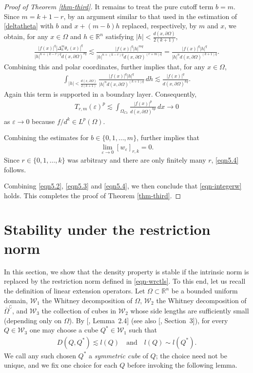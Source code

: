 \documentclass[11pt,twoside]{article}
\def\rn{{\mathbb{R}^n}}
\def\boz{{\Omega}}
\def\vez{\varepsilon}
\def\pa{\partial}                %
\theoremstyle{mylem}
\theoremstyle{definition}
\numberwithin{equation}{section}
\begin{document}
\begin{proof}[Proof of Theorem \ref{thm-third}]
It remains to treat the pure cutoff term $b=m$.  Since $m=k+1-r$, by an argument similar to that used in the estimation of \eqref{deltatheta}
with $b$ and $x+(m-b)h$ replaced, respectively, by $m$ and $x$, we obtain, for any $x\in\boz$ and $h\in\rn$ satisfying $|h|<\frac{d(x,\pa\boz)}{2(k+1)}$,
\begin{align*}
\frac{|f(x)|^q|\Delta_h^m\theta_\vez(x)|^q}
{|h|^{n+(k-r)q}d(x,\pa\boz)^{rq}}
\lesssim
\frac{|f(x)|^q |h|^{mq}}
{|h|^{n+(k-r)q}d(x,\pa\boz)^{(r+m)q}}
=\frac{|f(x)|^q |h|^q}{|h|^n d(x,\pa\boz)^{(k+1)q}}.
\end{align*}
Combining this and polar coordinates, further implies that, for any $x\in\boz$,
\begin{align*}
\int_{|h|<\frac{d(x,\pa\boz)}{2(k+1)}}
\frac{|f(x)|^q |h|^q}{|h|^n d(x,\pa\boz)^{(k+1)q}}\,dh
\lesssim
\frac{|f(x)|^q}{d(x,\pa\boz)^{kq}}.
\end{align*}
Again this term is supported in a boundary layer.  Consequently,
\begin{align*}
T_{r,m}(\vez)^p
\lesssim
\int_{\boz_{C\vez}}\frac{|f(x)|^p}{d(x,\pa\boz)^{kp}}\,dx
\to0
\end{align*}
as $\vez\to0$ because $f/d^k\in L^p(\boz)$.

Combining the estimates for $b\in\{0,1,\dots,m\}$, further implies that
\begin{align*}
\lim_{\vez\to0}[w_\vez]_{r,k}=0.
\end{align*}
Since $r\in\{0,1,\dots,k\}$ was arbitrary and there are only finitely many $r$, \eqref{eqn5.4} follows.

Combining \eqref{eqn5.2}, \eqref{eqn5.3} and \eqref{eqn5.4},
we then conclude that \eqref{eqn-integerw} holds. This completes the proof of Theorem \ref{thm-third}.
\end{proof}

\section{Stability under the restriction norm}\label{s5}

In this section, we show that the density property is stable if the intrinsic norm is replaced by 
the restriction norm defined in \eqref{eqn-wrctls}. To this end, let us recall the 
definition of linear extension operators.
Let $\boz\subset\mathbb{R}^n$ be a bounded uniform domain, $\mathcal{W}_1$ the Whitney
decomposition of $\Omega$, $\mathcal{W}_2$ the Whitney
decomposition of $\overline{\Omega}^\complement$, and 
$\mathcal{W}_3$ the collection of cubes in $\mathcal{W}_2$ whose side lengths are sufficiently small
(depending only on \(\Omega\)). By [\cite{j1981}, Lemma~2.4] (see also [\cite{ps2017}, Section~3]), for every $Q\in\mathcal W_3$ one may choose a cube $Q^*\in\mathcal W_1$ such that
\begin{align}\label{eqn-7.1}
D(Q,Q^*) \lesssim l(Q) \quad\text{and}\quad l(Q)\sim l(Q^*).
\end{align}
We call any such chosen $Q^*$ a \emph{symmetric cube} of $Q$; the choice need not be unique, and we fix one choice for each $Q$ before invoking the following lemma.
\end{document}
